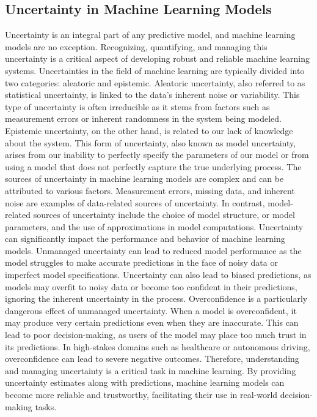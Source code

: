\subsection{Uncertainty in Machine Learning Models}
Uncertainty is an integral part of any predictive model, and machine learning models are no exception. Recognizing, quantifying, and managing this uncertainty is a critical aspect of developing robust and reliable machine learning systems. Uncertainties in the field of machine learning are typically divided into two categories: aleatoric and epistemic. Aleatoric uncertainty, also referred to as statistical uncertainty, is linked to the data's inherent noise or variability. This type of uncertainty is often irreducible as it stems from factors such as measurement errors or inherent randomness in the system being modeled. Epistemic uncertainty, on the other hand, is related to our lack of knowledge about the system. This form of uncertainty, also known as model uncertainty, arises from our inability to perfectly specify the parameters of our model or from using a model that does not perfectly capture the true underlying process. The sources of uncertainty in machine learning models are complex and can be attributed to various factors. Measurement errors, missing data, and inherent noise are examples of data-related sources of uncertainty. In contrast, model-related sources of uncertainty include the choice of model structure, or model parameters, and the use of approximations in model computations.
Uncertainty can significantly impact the performance and behavior of machine learning models. Unmanaged uncertainty can lead to reduced model performance as the model struggles to make accurate predictions in the face of noisy data or imperfect model specifications. Uncertainty can also lead to biased predictions, as models may overfit to noisy data or become too confident in their predictions, ignoring the inherent uncertainty in the process. Overconfidence is a particularly dangerous effect of unmanaged uncertainty. When a model is overconfident, it may produce very certain predictions even when they are inaccurate. This can lead to poor decision-making, as users of the model may place too much trust in its predictions. In high-stakes domains such as healthcare or autonomous driving, overconfidence can lead to severe negative outcomes. Therefore, understanding and managing uncertainty is a critical task in machine learning. By providing uncertainty estimates along with predictions, machine learning models can become more reliable and trustworthy, facilitating their use in real-world decision-making tasks.
